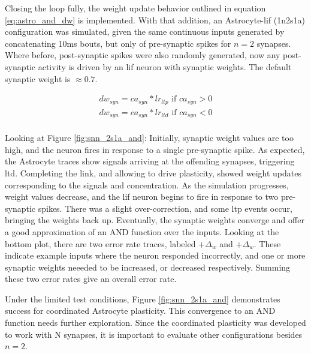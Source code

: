 Closing the loop fully, the weight update behavior outlined in equation
\ref{eq:astro_and_dw} is implemented. With that addition, an Astrocyte-\Gls{lif} (1n2s1a)
configuration was simulated, given the same continuous inputs generated by
concatenating 10ms bouts, but only of pre-synaptic spikes for $n=2$
synapses. Where before, post-synaptic spikes were also randomly generated, now
any post-synaptic activity is driven by an \Gls{lif} neuron with synaptic weights.
The default synaptic weight is $\approx 0.7$.

\begin{align}
  dw_{syn} = ca_{syn} * lr_{ltp} \textrm{ if } ca_{syn} >
  0 \label{eq:astro_and_dw} \\
  dw_{syn} = ca_{syn} * lr_{ltd} \textrm{ if } ca_{syn} < 0 \\
\end{align}



Looking at Figure \ref{fig:snn_2s1a_and}: Initially, synaptic weight values are
too high, and the neuron fires in response to a single pre-synaptic spike. As
expected, the Astrocyte traces show \dser signals arriving at the offending
synapses, triggering \Gls{ltd}. Completing the link, and allowing \ca to drive
plasticity, showed weight updates corresponding to the \dser signals and \ca
concentration. As the simulation progresses, weight values decrease, and the \Gls{lif}
neuron begins to fire in response to two pre-synaptic spikes. There was a slight
over-correction, and some \Gls{ltp} events occur, bringing the weights back
up. Eventually, the synaptic weights converge and offer a good approximation of
an AND function over the inputs. Looking at the bottom plot, there are two error
rate traces, labeled $+\Delta_w$ and $+\Delta_w$. These indicate example inputs
where the neuron responded incorrectly, and one or more synaptic weights neeeded
to be increased, or decreased respectively. Summing these two error rates give
an overall error rate.

Under the limited test conditions, Figure \ref{fig:snn_2s1a_and} demonstrates
success for coordinated Astrocyte plasticity. This convergence to an AND
function needs further exploration. Since the coordinated plasticity was
developed to work with N synapses, it is important to evaluate other
configurations besides $n=2$.


